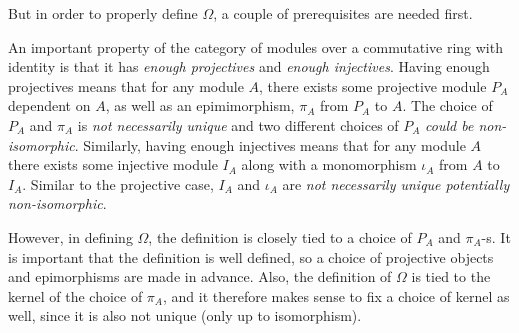 But in order to properly define \( \Omega \), a couple of prerequisites are needed first.

An important property of the category of modules over a commutative ring with identity is that it has \emph{enough projectives} and \emph{enough injectives}. Having enough projectives means that for any module \( A \), there exists some projective module \( P_A \) dependent on \( A \), as well as an epimimorphism, \( \pi_A \) from \( P_A \) to \( A \). The choice of \( P_A \) and \( \pi_A \) is \emph{not necessarily unique} and two different choices of \( P_A \) \emph{could be non-isomorphic}. Similarly, having enough injectives means that for any module \( A \) there exists some injective module \( I_A \) along with a monomorphism \( \iota_A \) from \( A \) to \( I_A \). Similar to the projective case, \( I_A \) and \( \iota_A \) are \emph{not necessarily unique potentially non-isomorphic}.

However, in defining \( \Omega \), the definition is closely tied to a choice of \( P_A \) and \( \pi_A \)-s. It is important that the definition is well defined, so a choice of projective objects and epimorphisms are made in advance. Also, the definition of \( \Omega \) is tied to the kernel of the choice of \( \pi_A \), and it therefore makes sense to fix a choice of kernel as well, since it is also not unique (only up to isomorphism).


